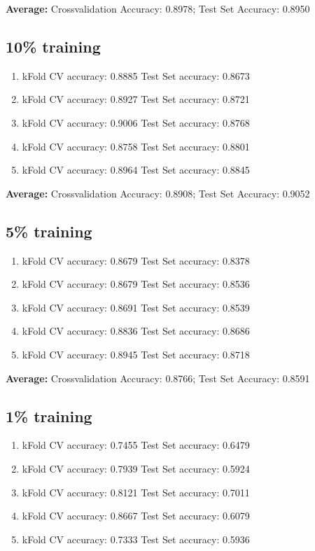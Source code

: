 \documentclass{article}
\begin{document}
	\textbf{Average:} Crossvalidation Accuracy: 0.8978;  Test Set Accuracy: 0.8950

	\subsection{10\% training}
	\begin{enumerate}
		\item kFold CV accuracy: 0.8885  \indent Test Set accuracy: 0.8673
		\item kFold CV accuracy: 0.8927  \indent Test Set accuracy: 0.8721
		\item kFold CV accuracy: 0.9006  \indent Test Set accuracy: 0.8768
		\item kFold CV accuracy: 0.8758  \indent Test Set accuracy: 0.8801
		\item kFold CV accuracy: 0.8964  \indent Test Set accuracy: 0.8845
	\end{enumerate}

	\textbf{Average:} Crossvalidation Accuracy: 0.8908;  Test Set Accuracy: 0.9052

	\subsection{5\% training}
	\begin{enumerate}
		\item kFold CV accuracy: 0.8679  \indent Test Set accuracy: 0.8378
		\item kFold CV accuracy: 0.8679  \indent Test Set accuracy: 0.8536
		\item kFold CV accuracy: 0.8691  \indent Test Set accuracy: 0.8539
		\item kFold CV accuracy: 0.8836  \indent Test Set accuracy: 0.8686
		\item kFold CV accuracy: 0.8945  \indent Test Set accuracy: 0.8718
	\end{enumerate}

	\textbf{Average:} Crossvalidation Accuracy: 0.8766;  Test Set Accuracy: 0.8591

	\subsection{1\% training}
	\begin{enumerate}
		\item kFold CV accuracy: 0.7455  \indent Test Set accuracy: 0.6479
		\item kFold CV accuracy: 0.7939  \indent Test Set accuracy: 0.5924
		\item kFold CV accuracy: 0.8121  \indent Test Set accuracy: 0.7011
		\item kFold CV accuracy: 0.8667  \indent Test Set accuracy: 0.6079
		\item kFold CV accuracy: 0.7333  \indent Test Set accuracy: 0.5936
	\end{enumerate}
\end{document}
